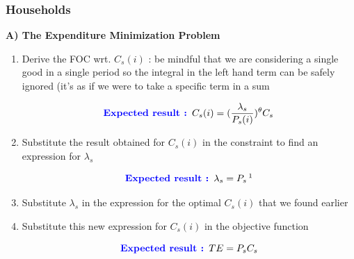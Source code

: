 \documentclass{article}
\begin{document}
\subsubsection{Households}

\textbf{A) The Expenditure Minimization Problem}
\begin{enumerate}
    \item Derive the FOC wrt. $C_s(i)$ : be mindful that we are considering a single good in a single period so the integral in the left hand term can be safely ignored (it's as if we were to take a specific term in a sum
    \begin{expectedresultsbox}
    \begin{equation}
        \textcolor{blue}{\textbf{Expected result : }} C_s(i) = (\frac{\lambda_s}{P_s(i)})^{\theta}C_s
    \end{equation}
    \end{expectedresultsbox}
    \item Substitute the result obtained for $C_s(i)$ in the constraint to find an expression for $\lambda_s$
    \begin{expectedresultsbox}
    \begin{equation}
        \textcolor{blue}{\textbf{Expected result : }} \lambda_s = P_s \,\footnotemark
    \end{equation}
    \end{expectedresultsbox}
    \item Substitute $\lambda_s$  in the expression for the optimal $C_s(i)$ that we found earlier
    \item Substitute this new expression for $C_s(i)$ in the objective function
    \begin{expectedresultsbox}
    \begin{equation}
        \textcolor{blue}{\textbf{Expected result : }} TE = P_sC_s
    \end{equation}        
    \end{expectedresultsbox}
\end{enumerate}

\end{document}
